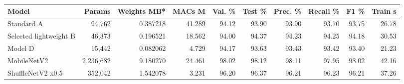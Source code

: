 \begin{tabular}{lrrrrrrrrr}
\toprule
Model & Params & Weights MB* & MACs M & Val. \% & Test \% & Prec. \% & Recall \% & F1 \% & Train s \\
\midrule
Standard A & 94,762 & 0.387218 & 41.289 & 94.12 & 93.90 & 93.90 & 93.70 & 93.75 & 26.78 \\
Selected lightweight B & 46,373 & 0.196521 & 18.562 & 94.00 & 94.37 & 94.23 & 94.25 & 94.18 & 30.53 \\
Model D & 15,442 & 0.082062 & 4.729 & 94.17 & 93.63 & 93.43 & 93.42 & 93.40 & 21.23 \\
MobileNetV2 & 2,236,682 & 9.180270 & 24.461 & 98.02 & 98.12 & 98.11 & 97.95 & 98.02 & 42.16 \\
ShuffleNetV2 x0.5 & 352,042 & 1.542078 & 3.231 & 96.20 & 96.37 & 96.21 & 96.23 & 96.21 & 37.26 \\
\bottomrule
\end{tabular}
